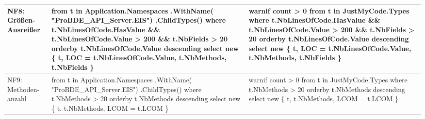 \begin{longtable}{|>{\raggedright\arraybackslash}p{}|>{\raggedright\arraybackslash}p{}|>{\raggedright\arraybackslash}p{}|}
NF8: Größen-Ausreißer &
{\ttfamily
from t in Application.Namespaces\newline
\quad .WithName(\newline
\quad \quad "ProBDE\_API\_Server.EIS")\newline
\quad .ChildTypes()\newline
where t.NbLinesOfCode.HasValue \newline
\quad \&\& t.NbLinesOfCode.Value > 200 \newline
\quad \&\& t.NbFields > 20\newline
orderby t.NbLinesOfCode.Value \newline
\quad descending\newline
select new \{ t, \newline
\quad LOC = t.NbLinesOfCode.Value, \newline
\quad t.NbMethods, t.NbFields \}
}
&
{\ttfamily
warnif count > 0\newline
from t in JustMyCode.Types\newline
where t.NbLinesOfCode.HasValue \newline
\quad \&\& t.NbLinesOfCode.Value > 200 \newline
\quad \&\& t.NbFields > 20\newline
orderby t.NbLinesOfCode.Value \newline
\quad descending\newline
select new \{ t, \newline
\quad LOC = t.NbLinesOfCode.Value, \newline
\quad t.NbMethods, t.NbFields \}
}
\\ \hline

NF9: Methoden-anzahl &
{\ttfamily
from t in Application.Namespaces\newline
\quad .WithName(\newline
\quad \quad "ProBDE\_API\_Server.EIS")\newline
\quad .ChildTypes()\newline
where t.NbMethods > 20\newline
orderby t.NbMethods descending\newline
select new \{ t, t.NbMethods, \newline
\quad LCOM = t.LCOM \}
}
&
{\ttfamily
warnif count > 0\newline
from t in JustMyCode.Types\newline
where t.NbMethods > 20\newline
orderby t.NbMethods descending\newline
select new \{ t, t.NbMethods, \newline
\quad LCOM = t.LCOM \}
}
\\ \hline


\end{longtable}
